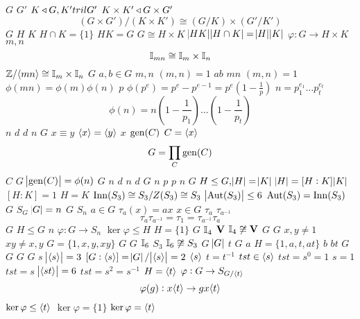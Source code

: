 \documentclass{article}
\begin{document}
$G$
$G'$
$K\triangleleft G, K'tril G'$
$K\times K'\triangleleft
   G\times G'$
\begin{equation*}
   (G\times G')/(K\times K')\cong (G/K)\times(G'/K')
   \end{equation*}
$G$
$H$
$K$
$H\cap K=\{1\}$
$HK=G$
$G\cong H\times K$
$\abs{HK}\abs{H\cap K}=\abs{H}\abs{K}$
$\varphi:G\to H\times
   K$
$m,n$
\begin{equation*}
   \mathbb{I}_{mn}\cong\mathbb{I}_m\times\mathbb{I}_n
   \end{equation*}
$\mathbb{Z}/\langle mn\rangle\cong\mathbb{I}_m\times\mathbb{I}_n$
$G$
$a,b\in G$
$m,n$
$(m,n)=1$
$ab$
$mn$
$(m,n)=1$
$\phi(mn)=\phi(m)\phi(n)$
$p$
$\phi(p^e)=p^e-p^{e-1}=p^e(1-\frac{1}{p})$
$n=p_1^{e_1}\dots p_t^{e_t}$
\begin{equation*}
      \phi(n)=n(1-\frac{1}{p_1})\dots(1-\frac{1}{p_t})
      \end{equation*}
$n$
$d$
$d$
$n$
$G$
$x\equiv y$
$\langle x\rangle=\langle
   y\rangle$
$x$
$\operatorname{gen}(C)$
$C=\langle
   x\rangle$
\begin{equation*}
   G=\displaystyle\prod_{C}\operatorname{gen}(C)
   \end{equation*}
$C$
$G$
$\abs{\operatorname{gen}(C)}=\phi(n)$
$G$
$n$
$d$
$n$
$d$
$G$
$n$
$p$
$p$
$n$
$G$
$H\le G, \abs{H}=\abs{K}$
$\abs{H}=[H:K]\abs{K}$
$[H:K]=1$
$H=K$
$\operatorname{Inn}(S_3)\cong S_3/Z(S_3)\cong S_3$
$\abs{\operatorname{Aut}(S_3)}\le 6$
$\operatorname{Aut}(S_3)=\operatorname{Inn}(S_3)$
$G$
$S_G$
$\abs{G}=n$
$G$
$S_n$
$a\in G$
$\tau_a(x)=ax$
$x\in G$
$\tau_a$
$\tau_{a^{-1}}$
\begin{equation*}
   \tau_a\tau_{a^{-1}}=\tau_1=\tau_{a^{-1}}\tau_a
   \end{equation*}
$G$
$H\le G$
$n$
$\varphi:G\to S_n$
$\ker\varphi\le H$
$H=\{1\}$
$G$
$\mathbb{I}_4$
$\operatorname{\textbf{V}}$
$\mathbb{I}_4\not\cong\operatorname{\textbf{V}}$
$G$
$G$
$x,y\neq 1$
$xy\neq x,y$
$G=\{1,x,y,xy\}$
$G$
$G$
$\mathbb{I}_6$
$S_3$
$\mathbb{I}_6\not\cong S_3$
$G$
$\abs{G}$
$t$
$G$
$a$
$H=\{1,a,t,at\}$
$b$
$bt$
$G$
$G$
$G$
$G$
$s$
$\abs{\langle s\rangle}=3$
$[G:\langle s\rangle]=\abs{G}/\abs{\langle s\rangle}=2$
$\langle
   s\rangle$
$t=t^{-1}$
$tst\in\langle s\rangle$
$tst=s^0=1$
$s=1$
$tst=s$
$\abs{\langle st\rangle}=6$
$tst=s^2=s^{-1}$
$H=\langle t\rangle$
$\varphi:G\to S_{G/\langle t\rangle}$
\begin{equation*}
   \varphi(g):x\langle t\rangle\to gx\langle t\rangle
   \end{equation*}
$\ker\varphi\le\langle t\rangle$
$\ker\varphi=\{1\}$
$\ker\varphi=\langle t\rangle$
\end{document}
